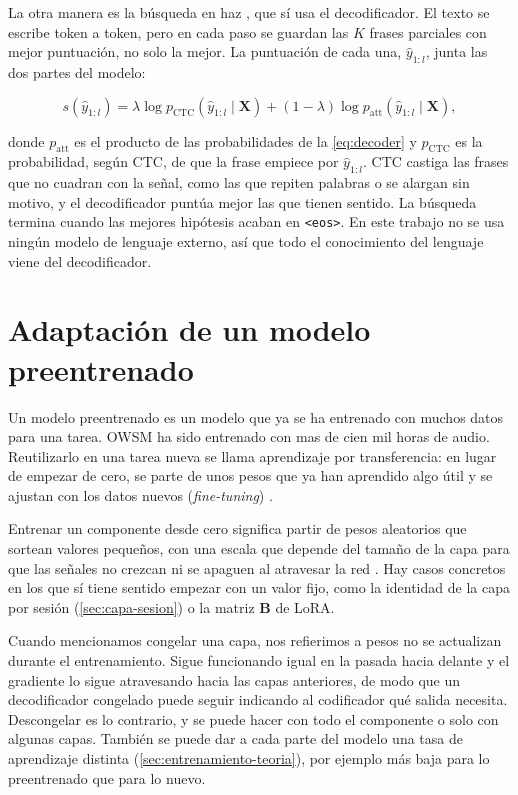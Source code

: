 La otra manera es la búsqueda en haz \cite{watanabe2017hybrid}, que sí usa el decodificador. El texto se escribe token a token, pero en cada paso se guardan las $K$ frases parciales con mejor puntuación, no solo la mejor. La puntuación de cada una, $\hat{y}_{1:l}$, junta las dos partes del modelo:

\begin{equation}
  s(\hat{y}_{1:l}) = \lambda \log p_{\mathrm{CTC}}(\hat{y}_{1:l} \mid \mathbf{X}) + (1-\lambda) \log p_{\mathrm{att}}(\hat{y}_{1:l} \mid \mathbf{X}),
  \label{eq:beam}
\end{equation}

donde $p_{\mathrm{att}}$ es el producto de las probabilidades de la \cref{eq:decoder} y $p_{\mathrm{CTC}}$ es la probabilidad, según CTC, de que la frase empiece por $\hat{y}_{1:l}$. CTC castiga las frases que no cuadran con la señal, como las que repiten palabras o se alargan sin motivo, y el decodificador puntúa mejor las que tienen sentido. La búsqueda termina cuando las mejores hipótesis acaban en \texttt{<eos>}. En este trabajo no se usa ningún modelo de lenguaje externo, así que todo el conocimiento del lenguaje viene del decodificador.

\section{Adaptación de un modelo preentrenado}
\label{sec:adaptacion}

Un modelo preentrenado es un modelo que ya se ha entrenado con muchos datos para una tarea. OWSM ha sido entrenado con mas de cien mil horas de audio. Reutilizarlo en una tarea nueva se llama aprendizaje por transferencia: en lugar de empezar de cero, se parte de unos pesos que ya han aprendido algo útil y se ajustan con los datos nuevos (\textit{fine-tuning}) \cite{yosinski2014transferable}.

Entrenar un componente desde cero significa partir de pesos aleatorios que sortean valores pequeños, con una escala que depende del tamaño de la capa para que las señales no crezcan ni se apaguen al atravesar la red \cite{glorot2010understanding}. Hay casos concretos en los que sí tiene sentido empezar con un valor fijo, como la identidad de la capa por sesión (\cref{sec:capa-sesion}) o la matriz $\mathbf{B}$ de LoRA.

Cuando mencionamos congelar una capa, nos refierimos a  pesos no se actualizan durante el entrenamiento. Sigue funcionando igual en la pasada hacia delante y el gradiente lo sigue atravesando hacia las capas anteriores, de modo que un decodificador congelado puede seguir indicando al codificador qué salida necesita. Descongelar es lo contrario, y se puede hacer con todo el componente o solo con algunas capas. También se puede dar a cada parte del modelo una tasa de aprendizaje distinta (\cref{sec:entrenamiento-teoria}), por ejemplo más baja para lo preentrenado que para lo nuevo.

